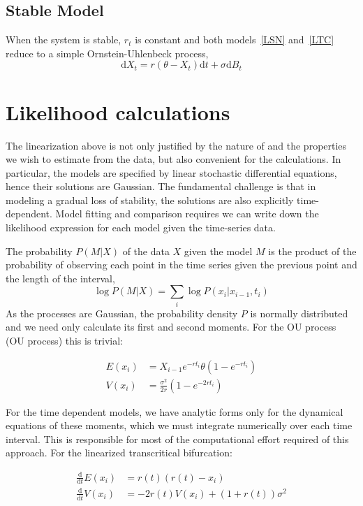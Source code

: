 \documentclass[authoryear, preprint,review,12pt]{elsarticle}
\newcommand{\ud}{\mathrm{d}}
\begin{document}
\subsection{Stable Model}
When the system is stable, $r_t$ is constant and both models~\eqref{LSN} and~\eqref{LTC} reduce to a simple Ornstein-Uhlenbeck process, 
\begin{equation}
\ud X_t = r (\theta - X_t) \ud t + \sigma \ud B_t \label{OU}
\end{equation}

\section{Likelihood calculations}\label{likelihood}
The linearization above is not only justified by the nature of and the properties we wish to estimate from the data,
but also convenient for the calculations. 
In particular, the models are specified by linear stochastic differential equations, hence their solutions are Gaussian.
The fundamental challenge is that in modeling a gradual loss of stability, the solutions are also explicitly time-dependent.
Model fitting and comparison requires we can write down the likelihood expression for each model given the time-series data.  

The probability $P(M|X)$ of the data $X$ given the model $M$ is the product of the probability of observing each point in the time series given the previous point and the length of the interval,  
\begin{equation}
\log P(M | X) =  \sum_i \log P(x_i | x_{i-1}, t_i)
\end{equation}
As the processes are Gaussian, the probability density $P$ is normally distributed and we need only calculate its first and second moments.  For the OU process (OU process) this is trivial:

\begin{align}
E(x_i) &= X_{i-1} e^{-r t_i} \theta \left(1 - e^{-rt_i} \right) \\
V(x_i) &= \frac{\sigma^2}{2 r} \left(1 - e^{-2 r t_i} \right)
\label{OUsoln}
\end{align}

For the time dependent models, we have analytic forms only for the dynamical equations of these moments, which we must integrate numerically over each time interval.  This is responsible for most of the computational effort required of this approach.  For the linearized transcritical bifurcation:

\begin{align}
\frac{\ud }{\ud t} E(x_i)&=  r(t)(r(t) - x_i) \\
\frac{\ud}{\ud t} V(x_i) &=  -2 r(t) V(x_i) + (1+r(t))\sigma^2 
\label{LTCsoln}
\end{align}
\end{document}
